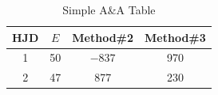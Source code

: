 \documentclass{aa}
\begin{document}
\begin{table}[ht!]
\caption{Simple A\&A Table}                 %
\label{table:1}    %
\centering                        %
\begin{tabular}{c c c c}      %
\hline\hline               %
HJD & $E$ & Method\#2 & Method\#3 \\         %
\hline                      %
   1 & 50 & $-837$ & 970 \\    %
   2 & 47 & 877    & 230 \\
\hline                                  %
\end{tabular}
\end{table}
\end{document}
